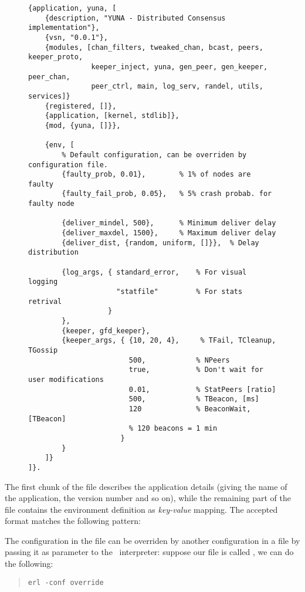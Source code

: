 \begin{figure}[hbt]
\begin{lstlisting}[label={code:ConfFile},
                   caption={default configuration file}]
{application, yuna, [
    {description, "YUNA - Distributed Consensus implementation"},
    {vsn, "0.0.1"},
    {modules, [chan_filters, tweaked_chan, bcast, peers, keeper_proto,
               keeper_inject, yuna, gen_peer, gen_keeper, peer_chan,
               peer_ctrl, main, log_serv, randel, utils, services]}
    {registered, []},
    {application, [kernel, stdlib]},
    {mod, {yuna, []}},

    {env, [
        % Default configuration, can be overriden by configuration file.
        {faulty_prob, 0.01},        % 1% of nodes are faulty
        {faulty_fail_prob, 0.05},   % 5% crash probab. for faulty node

        {deliver_mindel, 500},      % Minimum deliver delay
        {deliver_maxdel, 1500},     % Maximum deliver delay
        {deliver_dist, {random, uniform, []}},  % Delay distribution

        {log_args, { standard_error,    % For visual logging
                     "statfile"         % For stats retrival
                   }
        },
        {keeper, gfd_keeper},
        {keeper_args, { {10, 20, 4},     % TFail, TCleanup, TGossip
                        500,            % NPeers
                        true,           % Don't wait for user modifications
                        0.01,           % StatPeers [ratio]
                        500,            % TBeacon, [ms]
                        120             % BeaconWait, [TBeacon]
                        % 120 beacons = 1 min
                      }
        }
    ]}
]}.
\end{lstlisting}
\end{figure}

The first chunk of the file describes the application details (giving
the name of the application, the version number and so on), while the
remaining part of the file contains the environment definition as
\emph{key-value} mapping. The accepted format matches the following
pattern:

\begin{quote}
\centering
{}
\end{quote}

The configuration in the  file can be overriden by another
configuration in a  file by passing it as parameter to the
\Erlang\ interpreter: suppose our file is called , we
can do the following:
\begin{quote}
\begin{verbatim}
erl -conf override
\end{verbatim}
\end{quote}

